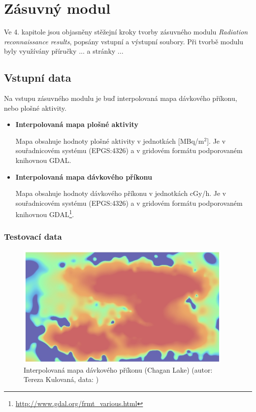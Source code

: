 \chapter{Zásuvný modul}
\label{4-plugin}

Ve 4. kapitole jsou objasněny stěžejní kroky tvorby zásuvného modulu
\textit{Radiation reconnaissance results}, popsány vstupní a výstupní
soubory. Při tvorbě modulu byly využívány příručky ... a stránky
...\cite{diveIntoPython}

\section{Vstupní data}

Na vstupu zásuvného modulu je buď interpolovaná mapa dávkového
příkonu, nebo plošné aktivity.

\begin{itemize}
\item \textbf{Interpolovaná mapa plošné aktivity}

  Mapa obsahuje hodnoty plošné aktivity v jednotkách
  {[}MBq/m$^2${]}. Je v souřadnicovém systému  (EPGS:4326)
  a v gridovém formátu podporovaném knihovnou GDAL.

\item \textbf{Interpolovaná mapa dávkového příkonu}

  Mapa obsahuje hodnoty dávkového příkonu v jednotkách cGy/h. Je v
  souřadnicovém systému  (EPGS:4326) a v gridovém formátu
  podporovaném knihovnou
  GDAL\footnote{\url{http://www.gdal.org/frmt_various.html}}.
	
\end{itemize}

\subsection{Testovací data}

\begin{figure}[H]
    \centering
      \includegraphics[width=300pt]{./pictures/chagan_spline.jpg}
      \caption[Interpolovaná mapa]{Interpolovaná mapa dávkového příkonu (Chagan Lake) (autor: Tereza Kulovaná, data: )}
      \label{fig:spline}
\end{figure}

